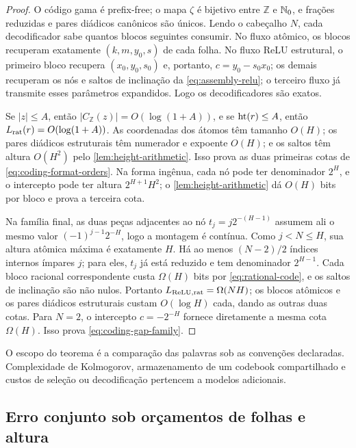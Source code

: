 \begin{proof}
O código gama é prefix-free; o mapa $\zeta$ é bijetivo entre $\mathbb Z$ e
$\mathbb{N}_0$, e frações reduzidas e pares diádicos canônicos são únicos. Lendo o
cabeçalho $N$, cada decodificador sabe quantos blocos seguintes consumir. No
fluxo atômico, os blocos recuperam exatamente $(k,m,y_0,s)$ de cada folha. No
fluxo ReLU estrutural, o primeiro bloco recupera $(x_0,y_0,s_0)$ e, portanto,
$c=y_0-s_0x_0$; os demais recuperam os nós e saltos de inclinação da
\cref{eq:assembly-relu}; o terceiro fluxo já transmite esses parâmetros
expandidos. Logo os decodificadores são exatos.

Se $|z|\le A$, então $|C_{\mathbb Z}(z)|=O(\log(1+A))$, e se
$\operatorname{ht}(r)\le A$, então $L_{\rm rat}(r)=O(\log(1+A))$. As coordenadas dos
átomos têm tamanho $O(H)$; os pares diádicos estruturais têm numerador e
expoente $O(H)$; e os saltos têm altura $O(H^2)$ pelo
\cref{lem:height-arithmetic}. Isso prova as duas primeiras cotas de
\eqref{eq:coding-format-orders}. Na forma ingênua, cada nó pode ter
denominador $2^H$, e o intercepto pode ter altura $2^{H+1}H^2$; o
\cref{lem:height-arithmetic} dá $O(H)$ bits por bloco e prova a terceira cota.

Na família final, as duas peças adjacentes ao nó
$t_j=j2^{-(H-1)}$ assumem ali o mesmo valor
$(-1)^{j-1}2^{-H}$, logo a montagem é contínua. Como $j<N\le H$, sua altura
atômica máxima é exatamente $H$. Há ao menos $(N-2)/2$ índices internos
ímpares $j$; para eles, $t_j$ já está reduzido e tem denominador
$2^{H-1}$. Cada bloco racional correspondente custa $\Omega(H)$ bits por
\eqref{eq:rational-code}, e os saltos de inclinação são não nulos. Portanto
$L_{\rm ReLU,rat}=\Omega(NH)$; os blocos atômicos e os pares diádicos
estruturais custam $O(\log H)$ cada, dando as outras duas cotas. Para $N=2$,
o intercepto $c=-2^{-H}$ fornece diretamente a mesma cota $\Omega(H)$.
Isso prova \eqref{eq:coding-gap-family}.
\end{proof}

O escopo do teorema é a comparação das palavras sob as convenções declaradas.
Complexidade de Kolmogorov, armazenamento de um codebook compartilhado e
custos de seleção ou decodificação pertencem a modelos adicionais.

\subsection{Erro conjunto sob orçamentos de folhas e altura}
\label{subsec:joint-budget}

